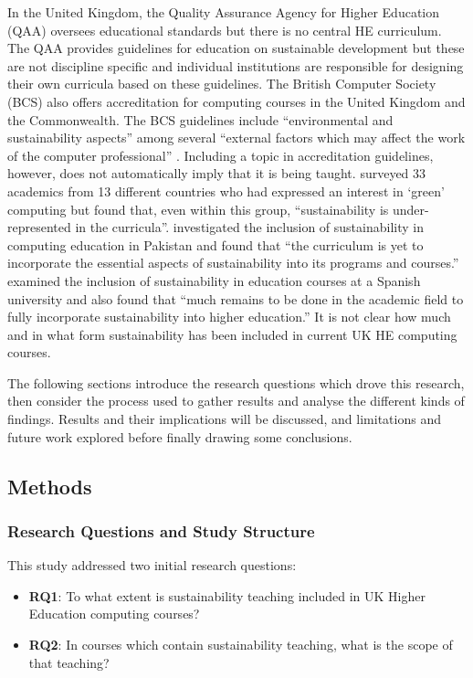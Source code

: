 In the United Kingdom, the Quality Assurance Agency for Higher Education (QAA) oversees educational standards but there is no central HE curriculum. The QAA provides guidelines for education on sustainable development \citep{QAA2021} but these are not discipline specific and individual institutions are responsible for designing their own curricula based on these guidelines. The British Computer Society (BCS) also offers accreditation for computing courses in the United Kingdom and the Commonwealth. The BCS guidelines include \enquote{environmental and sustainability aspects} among several \enquote{external factors which may affect the work of the computer professional} \citep{BCS2022}.  Including a topic in accreditation guidelines, however, does not automatically imply that it is being taught. \citet{Torre2017} surveyed 33 academics from 13 different countries who had expressed an interest in `green' computing but found that, even within this group, \enquote{sustainability is under-represented in the curricula}. \citet{Malik2019} investigated the inclusion of sustainability in computing education in Pakistan and found that \enquote{the curriculum is yet to incorporate the essential aspects of sustainability into its programs and courses.} \citet{Sanchez-Carracedo2021} examined the inclusion of sustainability in education courses at a Spanish university and also found that \enquote{much remains to be done in the academic field to fully incorporate sustainability into higher education.}  It is not clear how much and in what form sustainability has been included in current UK HE computing courses.

The following sections introduce the research questions which drove this research, then consider the process used to gather results and analyse the different kinds of findings. Results and their implications will be discussed, and limitations and future work explored before finally drawing some conclusions.

\subsection*{Methods}

\subsubsection*{Research Questions and Study Structure}

This study addressed two initial research questions:
\begin{itemize}
\item \textbf{RQ1}: To what extent is sustainability teaching included in UK Higher Education computing courses?
\item \textbf{RQ2}: In courses which contain sustainability teaching, what is the scope of that teaching?
\end{itemize}


